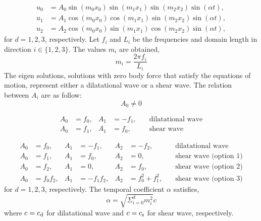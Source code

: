 \documentclass[12pt]{article}
\newcommand{\CS}{c_{\text s}}
\newcommand{\CD}{c_{\text d}}   %
\begin{document}
\begin{subequations}
\begin{align}
u_0 &= A_0 \sin (m_0 x_0) \sin (m_1 x_1) \sin (m_2 x_2) \sin (\alpha t), \\
u_1 &= A_1 \cos (m_0 x_0) \cos (m_1 x_1) \sin (m_2 x_2) \sin (\alpha t), \\
u_2 &= A_2 \cos (m_0 x_0) \sin (m_1 x_1) \cos (m_2 x_2) \sin (\alpha t), 
\end{align}
\end{subequations}
%
for $d = 1, 2, 3$, respectively. Let $f_i$ and $L_i$ be the frequencies and domain length in direction $i \in \{1, 2, 3\}$. The values $m_i$ are obtained,
%
\begin{equation}
m_i = \frac{2 \pi f_i}{L_i}
\end{equation}
% 
The eigen solutions, solutions with zero body force that satisfy the equations of motion, represent either a dilatational wave or a shear wave. The relation between $A_i$ are as follow:
%
\begin{equation}
A_0 \neq 0
\end{equation}


\begin{subequations}
\begin{align}
A_0 &= f_0, &A_1 &= -f_1,  \quad &\text{dilatational wave} \\
A_0 &= f_1, &A_1 &= f_0,  \quad &\text{shear wave}
\end{align}
\end{subequations}

\begin{subequations}
\begin{align}
A_0 &= f_0, &A_1 &= -f_1,  &A_2 &= -f_2,  \quad &\text{dilatational wave} \\
A_0 &= f_1, &A_1 &= f_0,  &A_2 &= 0,  \quad &\text{shear wave (option 1)} \\
A_0 &= f_2, &A_1 &= 0,  &A_2 &= f_0,  \quad &\text{shear wave (option 2)} \\
A_0 &= f_0 f_2, &A_1 &= -f_1 f_2,  &A_2 &= f_0^2 + f_1^2,  \quad &\text{shear wave (option 3)}
\end{align}
\end{subequations}
%
for $d = 1, 2, 3$, respectively. The temporal coefficient $\alpha$ satisfies,
%
\begin{equation}
\alpha = \sqrt{\Sigma_{i=0}^d m_i^2} c
\end{equation}
%
where $c = \CD$ for dilatational wave and $c = \CS$ for shear wave, respectively.
\end{document}
